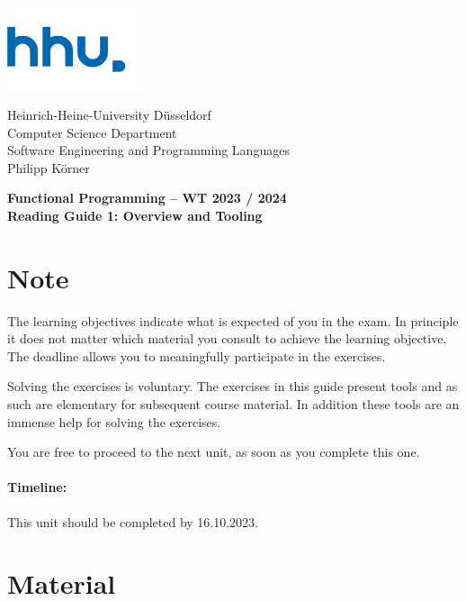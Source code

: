 \documentclass[11pt,a4paper]{article}
\begin{document}
	
\begin{minipage}[b]{\textwidth}
		\parbox[t]{5cm}{%
			\includegraphics[width=4cm]{unilogo}
			\hfill
		}
		\parbox[b]{11cm}{%
			Heinrich-Heine-University D\"usseldorf\\
			Computer Science Department\\
			Software Engineering and Programming Languages\\
		Philipp K\"orner
}
		
\end{minipage}
	\begin{center}
		\bf
		Functional Programming -- WT 2023 / 2024\\
		Reading Guide 1: Overview and Tooling
	\end{center}
	
	\pagestyle{empty}
	
	\section*{Note}
	The learning objectives indicate what is expected of you in the exam.
	In principle it does not matter which material you consult to achieve the learning objective.
	The deadline allows you to meaningfully participate in the exercises.
	
	Solving the exercises is voluntary.
	The exercises in this guide present tools and as such are elementary for subsequent course material.
	In addition these tools are an immense help for solving the exercises.
	
	You are free to proceed to the next unit, as soon as you complete this one.  
	
	\paragraph{Timeline:} This unit should be completed by 16.10.2023.
	
	\section{Material} 
	
\end{document}
